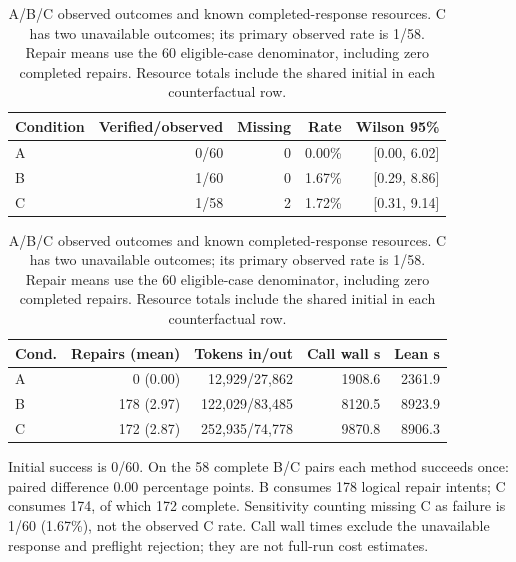 \begin{table}[t]
\centering
\caption{A/B/C observed outcomes and known completed-response resources. C has two unavailable outcomes; its primary observed rate is 1/58. Repair means use the 60 eligible-case denominator, including zero completed repairs. Resource totals include the shared initial in each counterfactual row.}
\label{tab:abc}
\small
\begin{tabular}{lrrrr}
\toprule
Condition & Verified/observed & Missing & Rate & Wilson 95\% \\
\midrule
A & 0/60 & 0 & 0.00\% & [0.00, 6.02] \\
B & 1/60 & 0 & 1.67\% & [0.29, 8.86] \\
C & 1/58 & 2 & 1.72\% & [0.31, 9.14] \\
\bottomrule
\end{tabular}
\par\vspace{4pt}
\begin{tabular}{lrrrr}
\toprule
Cond. & Repairs (mean) & Tokens in/out & Call wall s & Lean s \\
\midrule
A & 0 (0.00) & 12,929/27,862 & 1908.6 & 2361.9 \\
B & 178 (2.97) & 122,029/83,485 & 8120.5 & 8923.9 \\
C & 172 (2.87) & 252,935/74,778 & 9870.8 & 8906.3 \\
\bottomrule
\end{tabular}
\par\vspace{4pt}
\begin{minipage}{.98\linewidth}\footnotesize
Initial success is 0/60. On the 58 complete B/C pairs each method succeeds once: paired difference 0.00 percentage points. B consumes 178 logical repair intents; C consumes 174, of which 172 complete. Sensitivity counting missing C as failure is 1/60 (1.67\%), not the observed C rate. Call wall times exclude the unavailable response and preflight rejection; they are not full-run cost estimates.
\end{minipage}
\end{table}
